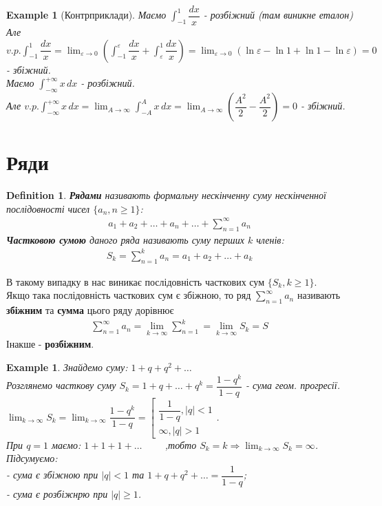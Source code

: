 \documentclass[a4paper, 10pt]{article}
\def\huge{\displaystyle}
\def\bigline{\vspace{5mm}\\}
\theoremstyle{theoremdd}
\theoremstyle{theoremdd}
\newtheorem{definition}[theorem]{Definition}
\theoremstyle{theoremdd}
\theoremstyle{theoremdd}
\newtheorem{example}[theorem]{Example}
\theoremstyle{theoremdd}
\theoremstyle{theoremdd}
\theoremstyle{theoremdd}
\theoremstyle{theoremdd}
\begin{document}
\begin{example}[Контрприклади]
Маємо $\huge\int_{-1}^1 \dfrac{dx}{x}$ - розбіжний (там виникне еталон)\\
Але $v.p. \huge\int_{-1}^1 \dfrac{dx}{x} = \huge\lim_{\varepsilon \to 0} \left( \int_{-1}^\varepsilon \dfrac{dx}{x} + \int_{\varepsilon}^1 \dfrac{dx}{x} \right) = \huge\lim_{\varepsilon \to 0} (\ln \varepsilon - \ln 1 + \ln 1 - \ln \varepsilon) = 0$ - збіжний.
\bigline
Маємо $\huge\int_{-\infty}^{+\infty} x\,dx$ - розбіжний.\\
Але $v.p. \huge\int_{-\infty}^{+\infty} x\,dx = \lim_{A \to \infty} \int_{-A}^{A} x\,dx = \lim_{A \to \infty} \left( \dfrac{A^2}{2} - \dfrac{A^2}{2} \right)= 0$ - збіжний.
\end{example}
\newpage
\fi

\section{Ряди}
\begin{definition} 
\textbf{Рядами} називають формальну нескінченну суму нескінченної послідовності чисел $\{a_n, n \geq 1\}$:
\begin{align*}
a_1 + a_2 + \dots + a_n + \dots + \huge \sum_{n=1}^{\infty} a_n
\end{align*}
\textbf{Частковою сумою} даного ряда називають суму перших $k$ членів:
\begin{align*}
S_k = \sum_{n=1}^k a_n = a_1 + a_2 + \dots + a_k
\end{align*}
\end{definition}
В такому випадку в нас виникає послідовність часткових сум $\{S_k, k \geq 1\}$.\\
Якщо така послідовність часткових сум є збіжною, то ряд $\huge \sum_{n=1}^{\infty} a_n$ називають \textbf{збіжним} та \textbf{сумма} цього ряду дорівнює
\begin{align*}
\sum_{n=1}^{\infty} a_n = \lim_{k \to \infty} \sum_{n=1}^k = \lim_{k \to \infty} S_k = S
\end{align*}
Інакше - \textbf{розбіжним}.

\begin{example}
Знайдемо суму: $1 + q + q^2 + \dots$\\
Розглянемо часткову суму $S_k = 1 + q + \dots + q^k = \dfrac{1 - q^k}{1 - q}$ - сума геом. прогресії.\\
$\huge \lim_{k \to \infty} S_k = \lim_{k \to \infty} \dfrac{1-q^k}{1 - q} = \left[ \begin{gathered} \dfrac{1}{1-q}, |q|<1 \\ \infty, |q|>1 \end{gathered} \right.$.
\\
При $q = 1$ маємо: $1 + 1 + 1 + \dots \hspace{1cm}$,тобто $S_k = k \Rightarrow \huge \lim_{k \to \infty} S_k = \infty$.\\
Підсумуємо:\\
- сума є збіжною при $|q| < 1$ та $1 + q + q^2 + \dots = \dfrac{1}{1-q}$;\\
- сума є розбіжнрю при $|q| \geq 1$.
\end{example}
\end{document}
